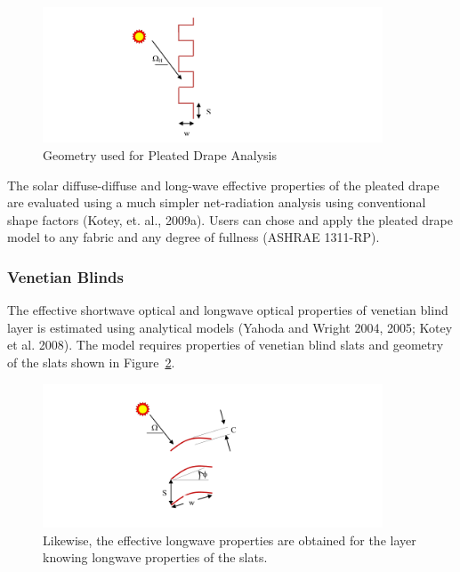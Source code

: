 \begin{figure}[hbtp] %
\centering
\includegraphics[width=0.9\textwidth, height=0.9\textheight, keepaspectratio=true]{media/image1844.svg.png}
\caption{Geometry used for Pleated Drape Analysis \protect \label{fig:geometry-used-for-pleated-drape-analysis}}
\end{figure}

The solar diffuse-diffuse and long-wave effective properties of the pleated drape are evaluated using a much simpler net-radiation analysis using conventional shape factors (Kotey, et. al., 2009a). Users can chose and apply the pleated drape model to any fabric and any degree of fullness (ASHRAE 1311-RP).

\subsubsection{Venetian Blinds}\label{venetian-blinds}

The effective shortwave optical and longwave optical properties of venetian blind layer is estimated using analytical models (Yahoda and Wright 2004, 2005; Kotey et al. 2008). The model requires properties of venetian blind slats and geometry of the slats shown in Figure~\ref{fig:likewise-the-effective-longwave-properties}.

\begin{figure}[hbtp] %
\centering
\includegraphics[width=0.9\textwidth, height=0.9\textheight, keepaspectratio=true]{media/image1845.svg.png}
\caption{Likewise, the effective longwave properties are obtained for the layer knowing longwave properties of the slats. \protect \label{fig:likewise-the-effective-longwave-properties}}
\end{figure}

